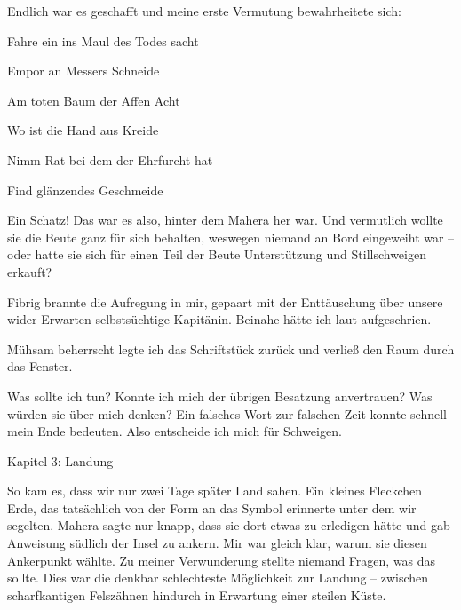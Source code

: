 Endlich war es geschafft und meine erste Vermutung bewahrheitete sich:

\vspace{0.5cm}\noindent
\begin{itshape}Fahre ein ins Maul des Todes sacht

Empor an Messers Schneide

\vspace{0.5cm}\noindent
Am toten Baum der Affen Acht

Wo ist die Hand aus Kreide

\vspace{0.5cm}\noindent
Nimm Rat bei dem der Ehrfurcht hat

Find glänzendes Geschmeide\end{itshape}

\vspace{0.5cm}\noindent
Ein Schatz! Das war es also, hinter dem Mahera her war. Und vermutlich wollte sie die Beute ganz für sich behalten, weswegen niemand an Bord eingeweiht war -- oder hatte sie sich für einen Teil der Beute Unterstützung und Stillschweigen erkauft?

Fibrig brannte die Aufregung in mir, gepaart mit der Enttäuschung über unsere wider Erwarten selbstsüchtige Kapitänin. Beinahe hätte ich laut aufgeschrien.

Mühsam beherrscht legte ich das Schriftstück zurück und verließ den Raum durch das Fenster.

Was sollte ich tun? Konnte ich mich der übrigen Besatzung anvertrauen? Was würden sie über mich denken? Ein falsches Wort zur falschen Zeit konnte schnell mein Ende bedeuten. Also entscheide ich mich für Schweigen.

\vspace{0.5cm}\noindent

{\label{2Kapitel 3: Landung}\vspace{0.5cm}\noindent\LARGE Kapitel 3: Landung}
\renewcommand{\storychapter}{Kapitel 3: Landung}

\vspace{0.5cm}\noindent
So kam es, dass wir nur zwei Tage später Land sahen. Ein kleines Fleckchen Erde, das tatsächlich von der Form an das Symbol erinnerte unter dem wir segelten. Mahera sagte nur knapp, dass sie dort etwas zu erledigen hätte und gab Anweisung südlich der Insel zu ankern. Mir war gleich klar, warum sie diesen Ankerpunkt wählte. Zu meiner Verwunderung stellte niemand Fragen, was das sollte. Dies war die denkbar schlechteste Möglichkeit zur Landung -- zwischen scharfkantigen Felszähnen hindurch in Erwartung einer steilen Küste.

